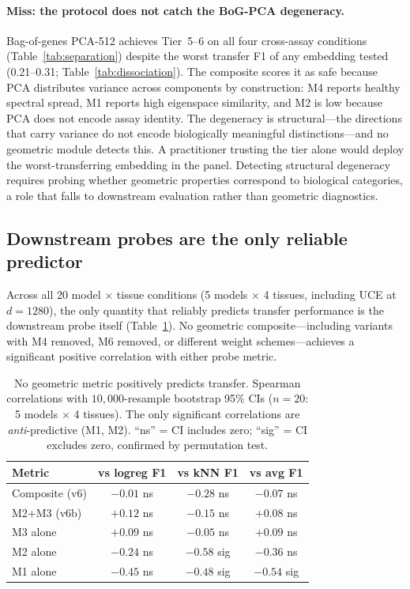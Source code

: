 \documentclass[9pt,lineno]{elife}
\begin{document}
\paragraph{Miss: the protocol does not catch the BoG-PCA degeneracy.} Bag-of-genes PCA-512 achieves Tier~5--6 on all four cross-assay conditions (Table~\ref{tab:separation}) despite the worst transfer F1 of any embedding tested (0.21--0.31; Table~\ref{tab:dissociation}). The composite scores it as safe because PCA distributes variance across components by construction: M4 reports healthy spectral spread, M1 reports high eigenspace similarity, and M2 is low because PCA does not encode assay identity. The degeneracy is structural---the directions that carry variance do not encode biologically meaningful distinctions---and no geometric module detects this. A practitioner trusting the tier alone would deploy the worst-transferring embedding in the panel. Detecting structural degeneracy requires probing whether geometric properties correspond to biological categories, a role that falls to downstream evaluation rather than geometric diagnostics.

\subsection{Downstream probes are the only reliable predictor}

Across all 20 model $\times$ tissue conditions (5 models $\times$ 4 tissues, including UCE at $d = 1280$), the only quantity that reliably predicts transfer performance is the downstream probe itself (Table~\ref{tab:probes}). No geometric composite---including variants with M4 removed, M6 removed, or different weight schemes---achieves a significant positive correlation with either probe metric.

\begin{table}[t]
\centering
\caption{No geometric metric positively predicts transfer. Spearman correlations with $10{,}000$-resample bootstrap 95\% CIs ($n = 20$: 5 models $\times$ 4 tissues). The only significant correlations are \emph{anti}-predictive (M1, M2). ``ns'' = CI includes zero; ``sig'' = CI excludes zero, confirmed by permutation test.}
\label{tab:probes}
\small
\begin{tabular}{@{}lccc@{}}
\toprule
Metric & vs logreg F1 & vs kNN F1 & vs avg F1 \\
\midrule
Composite (v6) & $-0.01$ ns & $-0.28$ ns & $-0.07$ ns \\
M2+M3 (v6b) & $+0.12$ ns & $-0.15$ ns & $+0.08$ ns \\
M3 alone & $+0.09$ ns & $-0.05$ ns & $+0.09$ ns \\
M2 alone & $-0.24$ ns & $\mathbf{-0.58}$ sig & $-0.36$ ns \\
M1 alone & $-0.45$ ns & $\mathbf{-0.48}$ sig & $\mathbf{-0.54}$ sig \\
\bottomrule
\end{tabular}
\end{table}
\end{document}
